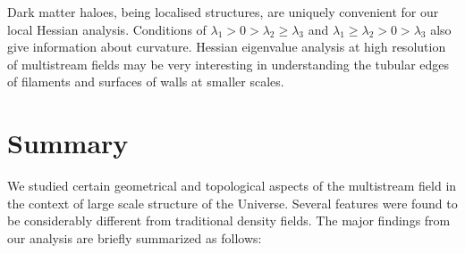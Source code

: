 \documentclass[fleqn,usenatbib,useAMS]{mnras}
\begin{document}

Dark matter haloes, being localised structures, are uniquely convenient for our local Hessian analysis. Conditions of $\lambda_1 > 0 > \lambda_2 \geq \lambda_3 $ and $\lambda_1 \geq \lambda_2 > 0 > \lambda_3 $ also give information about curvature. Hessian eigenvalue analysis at high resolution of multistream fields may be very interesting in understanding the tubular edges of filaments and surfaces of walls at smaller scales. 

\section{Summary}
\label{sec:summary}

We studied certain geometrical and topological aspects of the multistream field in the context of large scale structure of the Universe. Several features were found to be considerably different from traditional density fields. The major findings from our analysis are briefly summarized as follows: 
\end{document}
